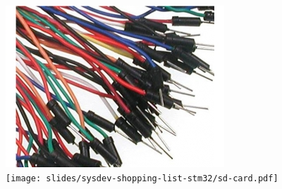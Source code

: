 \begin{frame}
\begin{columns}
    \includegraphics[height=0.15\textheight]{slides/kernel-shopping-list/jumper-wires.jpg} \\
    \vspace{1cm}
    \texttt{[image: slides/sysdev-shopping-list-stm32/sd-card.pdf]}
  \end{columns}
\end{frame}
